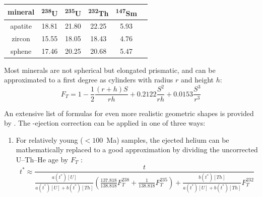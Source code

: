 \begin{refsection}
\begin{center}
\begin{tabular}{cccccc}
  mineral & \textsuperscript{238}U & \textsuperscript{235}U
  & \textsuperscript{232}Th & \textsuperscript{147}Sm \\ \hline
  apatite & 18.81 & 21.80 & 22.25 & 5.93 \\
  zircon & 15.55 & 18.05 & 18.43 & 4.76 \\
  sphene & 17.46 & 20.25 & 20.68 & 5.47
\end{tabular}
\label{tab:stoppingdistances}
\end{center}

Most minerals are not spherical but elongated prismatic, and can be
approximated to a first degree as cylinders with radius $r$ and height
$h$:
\begin{equation}
  F_T = 1 - \frac{1}{2}\frac{(r+h)S}{rh} +
  0.2122 \frac{S^2}{rh} + 0.0153 \frac{S^3}{r^3}
  \label{eq:FTcylinder}
\end{equation}

An extensive list of formulas for even more realistic geometric shapes
is provided by \citet{ketcham2011}. The \textalpha-ejection correction
can be applied in one of three ways:

\begin{enumerate}
\item For relatively young ($<100$~Ma) samples, the ejected helium can
  be mathematically replaced to a good approximation by dividing the
  uncorrected U--Th--He age by $F_T$ \citet{farley2002}:
  \begin{equation}
    t^* \approx \frac{t}{
      \frac{a(t^*)[U]}{a(t^*)[U]+b(t^*)[Th]}
      \left(
      \frac{137.818}{138.818} F_T^{238} +
      \frac{1}{138.818} F_T^{235}
      \right) + 
      \frac{b(t^*)[Th]}{a(t^*)[U]+b(t^*)[Th]} F_T^{232}
    }
    \label{eq:alphacorr1}
  \end{equation}


\end{enumerate}
\end{refsection}
